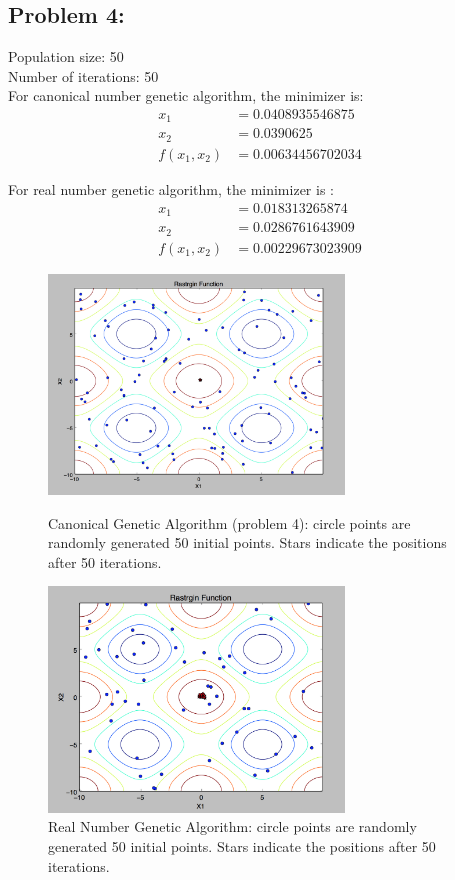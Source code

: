 \documentclass{article}
\begin{document}
\subsection*{{Problem 4: }}

Population size:  50  \\
Number of iterations:  50 \\ 
For canonical number genetic algorithm, the minimizer is: \\
\begin{align*}
x_1 & = 0.0408935546875 \\
x_2 & = 0.0390625  \\
f(x_1,x_2)  & = 0.00634456702034
\end{align*}

For real number genetic algorithm, the minimizer is : \\
\begin{align*} 
x_1 & = 0.018313265874 \\
x_2 & = 0.0286761643909 \\
f(x_1, x_2) & = 0.00229673023909
\end{align*} 

\begin{figure} [h]
\includegraphics[width=0.7\textwidth]{GA_canonical}
\centering
\caption{Canonical Genetic Algorithm (problem 4): circle points are randomly generated 50 initial points. Stars indicate the positions after 50 iterations. }

\includegraphics[width=0.7\textwidth]{GA_real_number}
\centering
\caption{Real Number Genetic Algorithm: circle points are randomly generated 50 initial points. Stars indicate the positions after 50 iterations. }

\end{figure}
\end{document}
